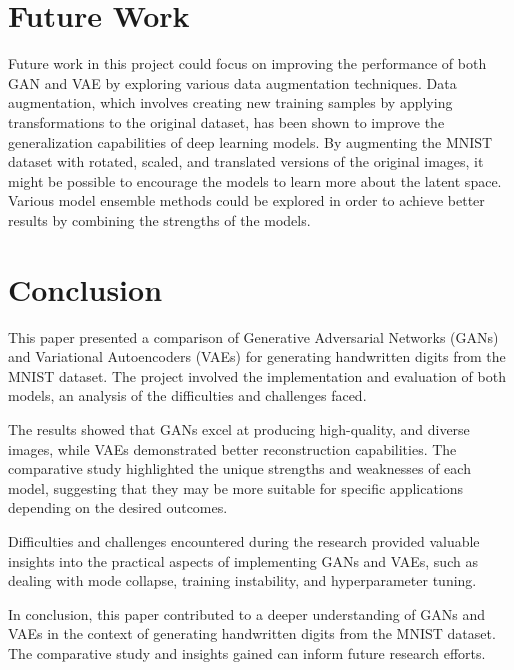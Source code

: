 \documentclass{article}
\begin{document}
\section{Future Work}
Future work in this project could focus on improving the performance of both GAN and VAE by exploring various data augmentation techniques. Data augmentation, which involves creating new training samples by applying transformations to the original dataset, has been shown to improve the generalization capabilities of deep learning models. By augmenting the MNIST dataset with rotated, scaled, and translated versions of the original images, it might be possible to encourage the models to learn more about the latent space. Various model ensemble methods could be explored in order to achieve better results by combining the strengths of the models.

\section{Conclusion}
This paper presented a  comparison of Generative Adversarial Networks (GANs) and Variational Autoencoders (VAEs) for generating handwritten digits from the MNIST dataset. The project involved the implementation and evaluation of both models, an analysis of the difficulties and challenges faced.

The results showed that GANs excel at producing high-quality, and diverse images, while VAEs demonstrated better reconstruction capabilities. The comparative study highlighted the unique strengths and weaknesses of each model, suggesting that they may be more suitable for specific applications depending on the desired outcomes.

Difficulties and challenges encountered during the research provided valuable insights into the practical aspects of implementing GANs and VAEs, such as dealing with mode collapse, training instability, and hyperparameter tuning.

In conclusion, this paper contributed to a deeper understanding of GANs and VAEs in the context of generating handwritten digits from the MNIST dataset. The comparative study and insights gained can inform future research efforts.



\end{document}
